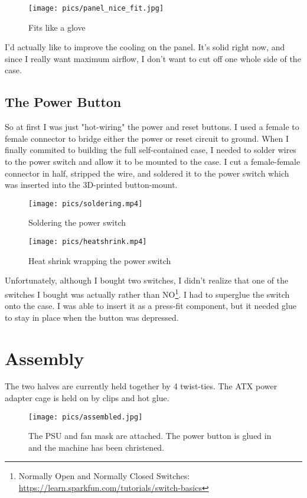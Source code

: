 \documentclass{article}
\begin{document}
\begin{figure}[h]
\texttt{[image: pics/panel\_nice\_fit.jpg]}
\caption{Fits like a glove}
\end{figure}

I'd actually like to improve the cooling on the panel. It's solid right now, and since I really want maximum airflow, I don't want to cut off one whole side of the case.

\subsection{The Power Button}
So at first I was just "hot-wiring" the power and reset buttons. I used a female to female connector to bridge either the power or reset circuit to ground. When I finally commited to building the full self-contained case, I needed to solder wires to the power switch and allow it to be mounted to the case. I cut a female-female connector in half, stripped the wire, and soldered it to the power switch which was inserted into the 3D-printed button-mount.
\begin{figure}[h]
\texttt{[image: pics/soldering.mp4]}
\caption{Soldering the power switch}
\end{figure}

\begin{figure}[h]
\texttt{[image: pics/heatshrink.mp4]}
\caption{Heat shrink wrapping the power switch}
\end{figure}

Unfortunately, although I bought two switches, I didn't realize that one of the switches I bought was actually rather than NO\footnote{Normally Open and Normally Closed Switches: \url{https://learn.sparkfun.com/tutorials/switch-basics}}. I had to superglue the switch onto the case. I was able to insert it as a press-fit component, but it needed glue to stay in place when the button was depressed. 

\section{Assembly}
The two halves are currently held together by 4 twist-ties. The ATX power adapter cage is held on by clips and hot glue.

\begin{figure}[h]
\texttt{[image: pics/assembled.jpg]}
\caption{The PSU and fan mask are attached. The power button is glued in and the machine has been christened.}
\end{figure}
\end{document}
